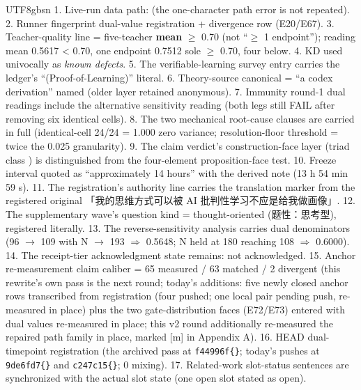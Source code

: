 \documentclass[11pt,letterpaper]{article}
\begin{document}
\begin{CJK}{UTF8}{gbsn}
1. Live-run data path:  (the one-character path error is not repeated). 2. Runner fingerprint dual-value registration + divergence row (E20/E67). 3. Teacher-quality line = five-teacher \textbf{mean} \ensuremath{\geq} 0.70 (not ``\ensuremath{\geq} 1 endpoint''); reading mean 0.5617 < 0.70, one endpoint 0.7512 sole \ensuremath{\geq} 0.70, four below. 4. KD used univocally as \emph{known defects}. 5. The verifiable-learning survey entry carries the ledger's ``(Proof-of-Learning)'' literal. 6. Theory-source canonical = ``a codex derivation'' named (older layer retained anonymous). 7. Immunity round-1 dual readings include the alternative sensitivity reading (both legs still FAIL after removing six identical cells). 8. The two mechanical root-cause clauses are carried in full (identical-cell 24/24 = 1.000 zero variance; resolution-floor threshold = twice the 0.025 granularity). 9. The claim verdict's construction-face layer (triad class ) is distinguished from the four-element proposition-face test. 10. Freeze interval quoted as ``approximately 14 hours'' with the derived note (13 h 54 min 59 s). 11. The registration's authority line carries the translation marker from the registered original 「我的思维方式可以被 AI 批判性学习\textellipsis{}\textellipsis{}不应是给我做画像」. 12. The supplementary wave's question kind = thought-oriented (题性：思考型), registered literally. 13. The reverse-sensitivity analysis carries dual denominators (96 \ensuremath{\to} 109 with N \ensuremath{\to} 193 \ensuremath{\Rightarrow} 0.5648; N held at 180 reaching 108 \ensuremath{\Rightarrow} 0.6000). 14. The receipt-tier acknowledgment state remains: not acknowledged. 15. Anchor re-measurement claim caliber = 65 measured / 63 matched / 2 divergent (this rewrite's own pass is the next round; today's additions: five newly closed anchor rows transcribed from registration (four pushed; one local pair pending push, re-measured in place) plus the two gate-distribution faces (E72/E73) entered with dual values re-measured in place; this v2 round additionally re-measured the repaired path family in place, marked [m] in Appendix A). 16. HEAD dual-timepoint registration (the archived pass at \texttt{f44996f\textellipsis\{\}}; today's pushes at \texttt{9de6fd7\textellipsis\{\}} and \texttt{c247c15\textellipsis\{\}}; 0 mixing). 17. Related-work slot-status sentences are synchronized with the actual slot state (one open slot stated as open).


\end{CJK}
\end{document}
